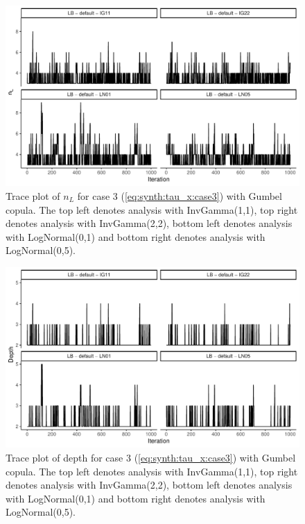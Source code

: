 \documentclass{amsart}
\begin{document}
\begin{figure}
	\centering
	\includegraphics[width = 0.75\linewidth]{trace_case3_gumbel_nterm.pdf}
	\caption{Trace plot of $n_L$ for case 3 (\cref{eq:synth:tau_x:case3}) with Gumbel copula. The top left denotes analysis with InvGamma(1,1), top right denotes analysis with InvGamma(2,2), bottom left denotes analysis with LogNormal(0,1) and bottom right denotes analysis with LogNormal(0,5).}
	\label{fig:case3:gumbel:nterm}
\end{figure}

\begin{figure}
	\centering
	\includegraphics[width = 0.75\linewidth]{trace_case3_gumbel_depth.pdf}
	\caption{Trace plot of depth for case 3 (\cref{eq:synth:tau_x:case3}) with Gumbel copula. The top left denotes analysis with InvGamma(1,1), top right denotes analysis with InvGamma(2,2), bottom left denotes analysis with LogNormal(0,1) and bottom right denotes analysis with LogNormal(0,5).}
	\label{fig:case3:gumbel:depth}
\end{figure}
\end{document}
